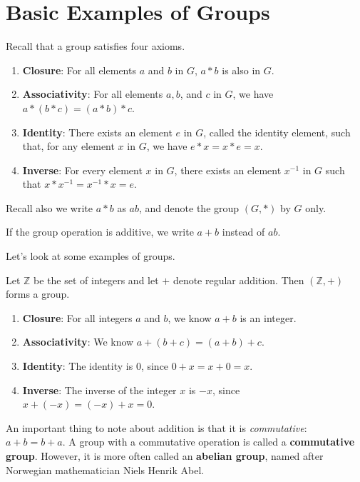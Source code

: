 \section{Basic Examples of Groups}
Recall that a group satisfies four axioms.
\begin{enumerate}
    \item \textbf{Closure}: For all elements $a$ and $b$ in $G$, $a \ast b$ is also in $G$.
    \item \textbf{Associativity}: For all elements $a, b$, and $c$ in $G$, we have $a \ast (b \ast c) = (a \ast b) \ast c$.
    \item \textbf{Identity}: There exists an element $e$ in $G$, called the identity element, such that, for any element $x$ in $G$, we have $e \ast x = x \ast e = x$.
    \item \textbf{Inverse}: For every element $x$ in $G$, there exists an element $x^{-1}$ in $G$ such that $x \ast x^{-1} = x^{-1} \ast x = e$.
\end{enumerate}

Recall also we write $a \ast b$ as $ab$, and denote the group $(G, \ast)$ by $G$ only.

\begin{remark}
    If the group operation is additive, we write $a + b$ instead of $ab$.
\end{remark}

Let's look at some examples of groups.

\newpage

\begin{example}
    Let $\mathbb{Z}$ be the set of integers and let $+$ denote regular addition. Then $(\mathbb{Z}, +)$ forms a group.
    \begin{enumerate}
        \item \textbf{Closure}: For all integers $a$ and $b$, we know $a + b$ is an integer.
        \item \textbf{Associativity}: We know $a + (b + c) = (a + b) + c$.
        \item \textbf{Identity}: The identity is 0, since $0 + x = x + 0 = x$.
        \item \textbf{Inverse}: The inverse of the integer $x$ is $-x$, since $x + (-x) = (-x) + x = 0$.
    \end{enumerate}
\end{example}

An important thing to note about addition is that it is \textit{commutative}: $a + b = b + a$. A group with a commutative operation is called a \textbf{commutative group}. However, it is more often called an \textbf{abelian group}, named after Norwegian mathematician Niels Henrik Abel.

